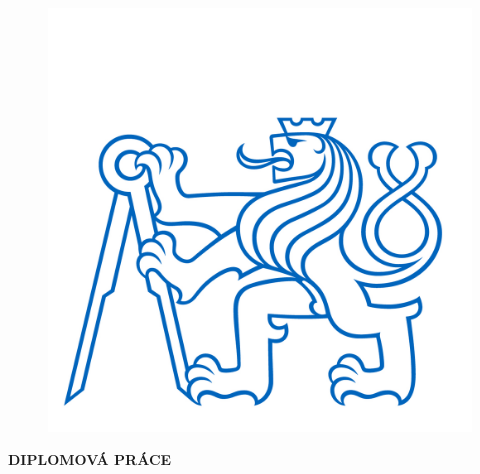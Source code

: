 \thispagestyle{empty}

\begin{center}
    {\Large \bf \cvut\\[2mm] \fjfi\\ }
    \vspace{3mm}
    
    {\large \bf \kdaiz}\\
     \vspace{2mm}  
   
   \vspace{0mm}

\begin{figure}[h]
\begin{center}
	\includegraphics[scale=1.5]{cvut.jpg}
\end{center}
\end{figure}

    \vspace{5mm}


   \vspace{0mm}
   {\Huge\textbf{DIPLOMOVÁ PRÁCE}}

   \vspace{15mm}
   {\Large \textbf{\nazevcz}}
   
\end{center}

